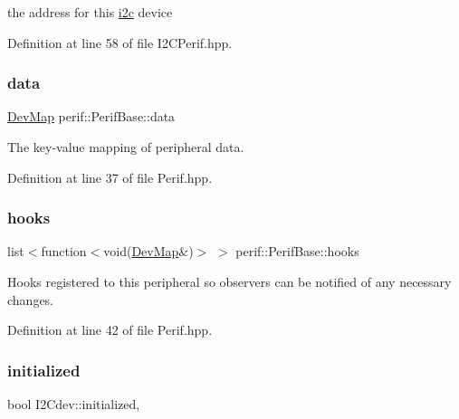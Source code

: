 the address for this \mbox{\hyperlink{namespacei2c}{i2c}} device 

Definition at line 58 of file I2\+C\+Perif.\+hpp.

\mbox{\label{classperif_1_1PerifBase_a1a3afaa535fda17e9f97123fffe78765}} 
\subsubsection{\texorpdfstring{data}{data}}
{\footnotesize\ttfamily \mbox{\hyperlink{Perif_8hpp_a358ff4ee6d24694ee7661f0cce14377e}{Dev\+Map}} perif\+::\+Perif\+Base\+::data\hspace{0.3cm}{\ttfamily [inherited]}}

The key-\/value mapping of peripheral data. 

Definition at line 37 of file Perif.\+hpp.

\mbox{\label{classperif_1_1PerifBase_a98964e5ca8384df64881265e0aa6d7b6}} 
\subsubsection{\texorpdfstring{hooks}{hooks}}
{\footnotesize\ttfamily list$<$function$<$void(\mbox{\hyperlink{Perif_8hpp_a358ff4ee6d24694ee7661f0cce14377e}{Dev\+Map}}\&)$>$ $>$ perif\+::\+Perif\+Base\+::hooks\hspace{0.3cm}{\ttfamily [inherited]}}

Hooks registered to this peripheral so observers can be notified of any necessary changes. 

Definition at line 42 of file Perif.\+hpp.

\mbox{\label{classI2Cdev_a94b914bfcbd0fe1f6fdd7b9c6f4ab921}} 
\subsubsection{\texorpdfstring{initialized}{initialized}}
{\footnotesize\ttfamily bool I2\+Cdev\+::initialized\hspace{0.3cm}{\ttfamily [protected]}, {\ttfamily [inherited]}}

